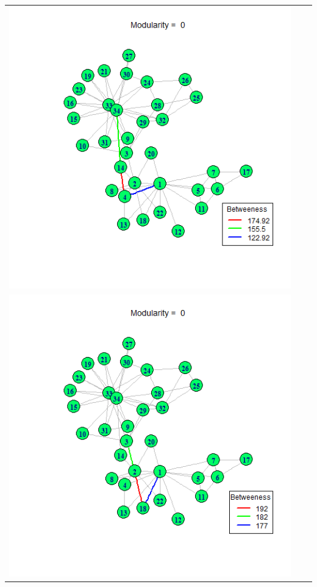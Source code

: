 \documentclass[letterpaper,11pt]{report}
\begin{document}
\begin{savenotes}
\begin{table}[htbp]
\begin{tabular}{ccc}
			\includegraphics[scale=0.25]{karateClub-community-0009.png} \\
			\includegraphics[scale=0.25]{karateClub-community-0010.png} &

\end{tabular}
\end{table}
\end{savenotes}
\end{document}
